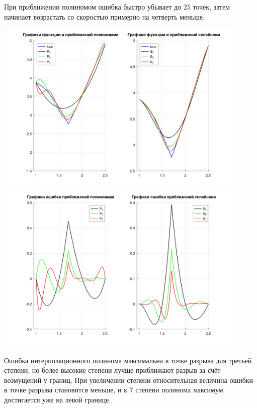 \documentclass[a4paper]{article}
\begin{document}
При приближении полиномом ошибка быстро убывает до 25 точек, затем начинает
возрастать со скоростью примерно на четверть меньше.
\begin{center}
\includegraphics[width=0.9\textwidth]{compGraphG.png}
\includegraphics[width=0.9\textwidth]{compErrG.png}
\end{center}
Ошибка интерполяционного полинома максимальна в точке разрыва для третьей степени, но более высокие степени лучше
приближают разрыв за счёт возмущений у границ. При увеличении степени относительная величина ошибки в точке разрыва
становится меньше, и к 7 степени полинома максимум достигается уже на левой границе.
\end{document}
